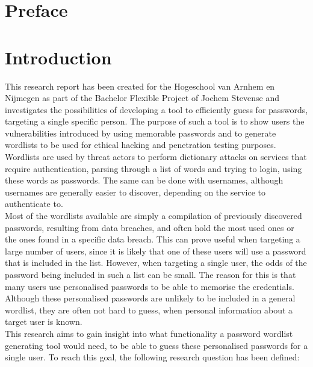 \documentclass[a4paper,12pt]{article}
\begin{document}
\section*{Preface}
\newpage
  
\tableofcontents

\newpage
\section{Introduction}
\label{ch:intro}
This research report has been created for the Hogeschool van Arnhem en Nijmegen as part of the Bachelor Flexible Project of Jochem Stevense and investigates the possibilities of developing a tool to efficiently guess for passwords, targeting a single specific person. The purpose of such a tool is to show users the vulnerabilities introduced by using memorable passwords and to generate wordlists to be used for ethical hacking and penetration testing purposes.\\

Wordlists are used by threat actors to perform dictionary attacks on services that require authentication, parsing through a list of words and trying to login, using these words as passwords. The same can be done with usernames, although usernames are generally easier to discover, depending on the service to authenticate to.\\
Most of the wordlists available are simply a compilation of previously discovered passwords, resulting from data breaches, and often hold the most used ones or the ones found in a specific data breach. This can prove useful when targeting a large number of users, since it is likely that one of these users will use a password that is included in the list. However, when targeting a single user, the odds of the password being included in such a list can be small. The reason for this is that many users use personalised passwords to be able to memorise the credentials. Although these personalised passwords are unlikely to be included in a general wordlist, they are often not hard to guess, when personal information about a target user is known.\\
This research aims to gain insight into what functionality a password wordlist generating tool would need, to be able to guess these personalised passwords for a single user. To reach this goal, the following research question has been defined:\\
\end{document}
